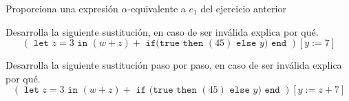 \bigskip
    
    \begin{exercise}
        Proporciona una expresión $\alpha$-equivalente a $e_1$ del ejercicio anterior 
    \end{exercise}

    \bigskip
    
    
    \begin{exercise}
         Desarrolla la siguiente sustitución, en caso de ser inválida explica por qué.
         \[
        (\texttt{ let } z = 3 \texttt{ in } (w + z) + \texttt{ if(} \texttt{true} \texttt{ then } (45) \texttt{ else } y \texttt{) } \texttt{end }) [y:=7]
         \]
    \end{exercise}

    \bigskip
    
    \begin{exercise}
        Desarrolla la siguiente sustitución paso por paso, en caso de ser inválida explica por qué. 
        \[
            (\texttt{ let } z = 3 \texttt{ in } (w + z) + \texttt{ if (} \texttt{true} \texttt{ then } (45) \texttt{ else } y \texttt{)} \texttt{ end }) [y:=z+7]
        \]
    \end{exercise}

    \bigskip

